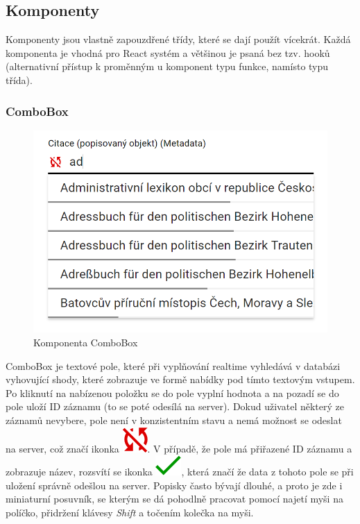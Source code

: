 \pagebreak
\subsection{Komponenty}
Komponenty jsou vlastně zapouzdřené třídy, které se dají použít vícekrát.
Každá komponenta je vhodná pro React systém a většinou je psaná bez tzv. hooků
(alternativní přístup k proměnným u komponent typu funkce, namísto typu třída).

\subsubsection{ComboBox}
\begin{figure}
	\centering
	\includegraphics[width=\linewidth]{img/ComboBox.png}
	\caption{Komponenta ComboBox}
\end{figure}
ComboBox je textové pole, které při vyplňování realtime vyhledává v databázi vyhovující shody,
které zobrazuje ve formě nabídky pod tímto textovým vstupem. Po kliknutí na nabízenou položku se
do pole vyplní hodnota a na pozadí se do pole uloží ID záznamu (to se poté odesílá na server).
Dokud uživatel některý ze záznamů nevybere, pole není v konzistentním stavu a nemá možnost se
odeslat na server, což značí ikonka
\includegraphics[height=\fontcharht\font`\B]{img/notSynced.png}.
V případě, že pole má přiřazené ID záznamu a zobrazuje název, rozsvítí se ikonka
\includegraphics[height=\fontcharht\font`\B]{img/synced.png},
která značí že data z tohoto pole se při uložení správně odešlou na server.
Popisky často bývají dlouhé, a proto je zde i miniaturní posuvník, se kterým se
dá pohodlně pracovat pomocí najetí myši na políčko, přidržení klávesy \textit{Shift} a
točením kolečka na myši.

